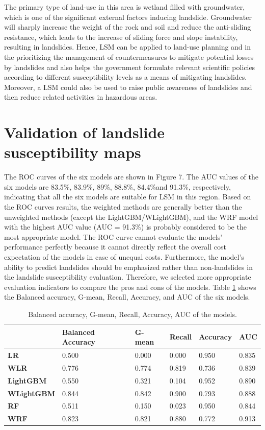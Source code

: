 \documentclass[a4paper,fleqn]{cas-sc}
\begin{document}
The primary type of land-use in this area is wetland filled with groundwater, which is one of the significant external factors inducing landslide. 
Groundwater will sharply increase the weight of the rock and soil and reduce the anti-sliding resistance, which leads to the increase of sliding force and slope instability, resulting in landslides. 
Hence, LSM can be applied to land-use planning and in the prioritizing the management of countermeasures to mitigate potential losses by landslides and also helps the government formulate relevant scientific policies according to different susceptibility levels as a means of mitigating landslides. 
Moreover, a LSM could also be used to raise public awareness of landslides and then reduce related activities in hazardous areas.

\section{Validation of landslide susceptibility maps}

The ROC curves of the six models are shown in Figure 7. 
The AUC values of the six models are 83.5\%, 83.9\%, 89\%, 88.8\%, 84.4\%and 91.3\%, respectively, indicating that all the six models are suitable for LSM in this region. 
Based on the ROC curves results, the weighted methods are generally better than the unweighted methods (except the LightGBM/WLightGBM), and the WRF model with the highest AUC value (AUC = 91.3\%) is probably considered to be the most appropriate model.
The ROC curve cannot evaluate the models' performance perfectly because it cannot directly reflect the overall cost expectation of the models in case of unequal costs. 
Furthermore, the model's ability to predict landslides should be emphasized rather than non-landslides in the landslide susceptibility evaluation. 
Therefore, we selected more appropriate evaluation indicators to compare the pros and cons of the models. 
Table \ref{tab_evaluate} shows the Balanced accuracy, G-mean, Recall, Accuracy, and AUC of the six models. 

\begin{table}
  \centering
  \caption{Balanced accuracy, G-mean, Recall, Accuracy, AUC of the models.}
    \begin{tabular}{llllll}
    \toprule
          & \textbf{Balanced Accuracy} & \textbf{G-mean} & \textbf{Recall} & \textbf{Accuracy} & \textbf{AUC} \\
    \midrule
    \textbf{LR} & 0.500  & 0.000  & 0.000  & 0.950  & 0.835  \\
    \textbf{WLR} & 0.776  & 0.774  & 0.819  & 0.736  & 0.839  \\
    \textbf{LightGBM} & 0.550  & 0.321  & 0.104  & 0.952  & 0.890  \\
    \textbf{WLightGBM} & 0.844  & 0.842  & 0.900  & 0.793  & 0.888  \\
    \textbf{RF} & 0.511  & 0.150  & 0.023  & 0.950  & 0.844  \\
    \textbf{WRF} & 0.823  & 0.821  & 0.880  & 0.772  & 0.913  \\
    \bottomrule
    \end{tabular}%
  \label{tab_evaluate}%
\end{table}%
\end{document}
